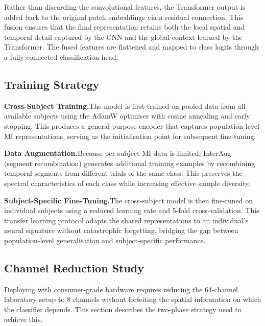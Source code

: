 \documentclass[12pt, a4paper]{article}
\begin{document}
Rather than discarding the convolutional features, the Transformer output is added back to the original patch embeddings via a residual connection. This fusion ensures that the final representation retains both the local spatial and temporal detail captured by the CNN and the global context learned by the Transformer. The fused features are flattened and mapped to class logits through a fully connected classification head.

\subsection{Training Strategy}

\textbf{Cross-Subject Training.}\quad The model is first trained on pooled data from all available subjects using the AdamW optimiser with cosine annealing and early stopping. This produces a general-purpose encoder that captures population-level MI representations, serving as the initialisation point for subsequent fine-tuning.

\textbf{Data Augmentation.}\quad Because per-subject MI data is limited, InterAug (segment recombination) generates additional training examples by recombining temporal segments from different trials of the same class. This preserves the spectral characteristics of each class while increasing effective sample diversity.

\textbf{Subject-Specific Fine-Tuning.}\quad The cross-subject model is then fine-tuned on individual subjects using a reduced learning rate and 5-fold cross-validation. This transfer learning protocol adapts the shared representations to an individual's neural signature without catastrophic forgetting, bridging the gap between population-level generalisation and subject-specific performance.

\subsection{Channel Reduction Study}

Deploying with consumer-grade hardware requires reducing the 64-channel laboratory setup to 8 channels without forfeiting the spatial information on which the classifier depends. This section describes the two-phase strategy used to achieve this.
\end{document}
